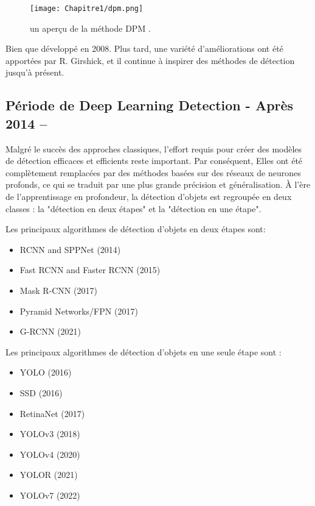 \begin{figure}[H]
\centering
\texttt{[image: Chapitre1/dpm.png]}
\caption{un aperçu de la méthode DPM \cite{w1}.}
\label{dpm}
\end{figure}

Bien que développé en 2008. Plus tard, une variété d'améliorations ont été apportées par R. Girshick, et il continue à inspirer des méthodes de détection jusqu'à présent.

     
\subsection{Période de Deep Learning Detection - Après 2014 –} 
Malgré le succès des approches classiques, l'effort requis pour créer des modèles de détection efficaces et efficients reste important. Par conséquent, Elles ont été complètement remplacées par des méthodes basées sur des réseaux de neurones profonds, ce qui se traduit par une plus grande précision et généralisation. À l'ère de l'apprentissage en profondeur, la détection d'objets est regroupée en deux classes : la "détection en deux étapes" et la "détection en une étape".

Les principaux algorithmes de détection d'objets en deux étapes sont:

    \begin{itemize}
    \item RCNN and SPPNet (2014)
    \item Fast RCNN and Faster RCNN (2015)
    \item Mask R-CNN (2017)
    \item Pyramid Networks/FPN (2017)
    \item G-RCNN (2021)
    \end{itemize}
    
Les principaux algorithmes de détection d'objets en une seule étape sont :

    \begin{itemize}
    \item YOLO (2016)
    \item SSD (2016)
    \item RetinaNet (2017)
    \item YOLOv3 (2018)
    \item YOLOv4 (2020)
    \item YOLOR (2021)
    \item YOLOv7 (2022)
    \end{itemize}
     

